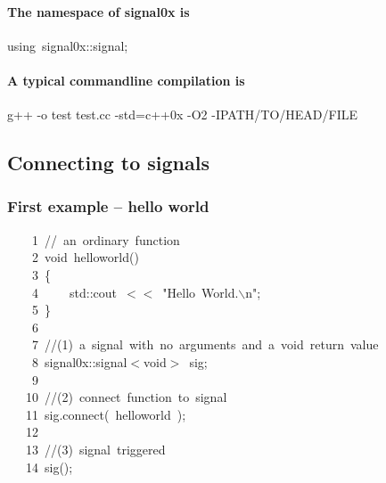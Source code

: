 \documentclass[9pt,onside,a4paper]{article}
\newcommand{\hlstd}[1]{\textcolor[rgb]{0.2,0,0.4}{#1}}
\newcommand{\hlesc}[1]{\textcolor[rgb]{0.65,0.09,0.38}{#1}}
\newcommand{\hlstr}[1]{\textcolor[rgb]{0.09,0.38,0.65}{#1}}
\newcommand{\hlslc}[1]{\textcolor[rgb]{0,0.4,0.2}{#1}}
\newcommand{\hlopt}[1]{\textcolor[rgb]{0.33,0.33,0.33}{#1}}
\newcommand{\hllin}[1]{\textcolor[rgb]{0.6,0.6,0.6}{#1}}
\newcommand{\hlkwa}[1]{\textcolor[rgb]{1,0.19,0.19}{#1}}
\newcommand{\hlkwb}[1]{\textcolor[rgb]{0.96,0.55,0.14}{#1}}
\newcommand{\hlkwd}[1]{\textcolor[rgb]{0.82,0.11,0.93}{#1}}
\newcommand{\hlred}[1]{\textcolor[rgb]{1.0,0.0,0.0}{#1}}
\begin{document}
\paragraph{The namespace of signal0x is\\}
\hlstd{}\hlkwa{using\ }\hlstd{signal0x}\hlopt{::}\hlstd{signal}\hlopt{;}\hspace*{\fill} 
\paragraph{A typical commandline compilation is\\}
\hlstd{}  g++ -o test test.cc -std=c++0x -O2 -I\hlred{PATH/TO/HEAD/FILE}



\subsection{Connecting to signals}




\subsubsection{First example -- hello world}

\ttfamily
\hlstd{}\hllin{\ \ \ \ 1\ }\hlslc{//\ an\ ordinary\ function}\\
\hllin{\ \ \ \ 2\ }\hlstd{}\hlkwb{void\ }\hlstd{}\hlkwd{hello\textunderscore world}\hlstd{}\hlopt{()}\\
\hllin{\ \ \ \ 3\ }\hlstd{}\hlopt{\{}\\
\hllin{\ \ \ \ 4\ }\hlstd{}\hlstd{\ \ \ \ }\hlstd{std}\hlopt{::}\hlstd{cout\ }\hlopt{$<$$<$\ }\hlstd{}\hlstr{"Hello\ World.}\hlesc{$\backslash$n}\hlstr{"}\hlstd{}\hlopt{;}\\
\hllin{\ \ \ \ 5\ }\hlstd{}\hlopt{\}}\\
\hllin{\ \ \ \ 6\ }\hlstd{}\\
\hllin{\ \ \ \ 7\ }\hlslc{//(1)\ a\ signal\ with\ no\ arguments\ and\ a\ void\ return\ value}\\
\hllin{\ \ \ \ 8\ }\hlstd{signal0x}\hlopt{::}\hlstd{signal}\hlopt{$<$}\hlstd{}\hlkwb{void}\hlstd{}\hlopt{$>$\ }\hlstd{sig}\hlopt{;}\\
\hllin{\ \ \ \ 9\ }\hlstd{}\\
\hllin{\ \ \ 10\ }\hlslc{//(2)\ connect\ function\ to\ signal}\\
\hllin{\ \ \ 11\ }\hlstd{sig}\hlopt{.}\hlstd{}\hlkwd{connect}\hlstd{}\hlopt{(\ }\hlstd{hello\textunderscore world\ }\hlopt{);}\\
\hllin{\ \ \ 12\ }\hlstd{}\\
\hllin{\ \ \ 13\ }\hlslc{//(3)\ signal\ triggered}\\
\hllin{\ \ \ 14\ }\hlstd{}\hlkwd{sig}\hlstd{}\hlopt{();}\hlstd{}\\
\mbox{}
\normalfont
\normalsize
\end{document}
